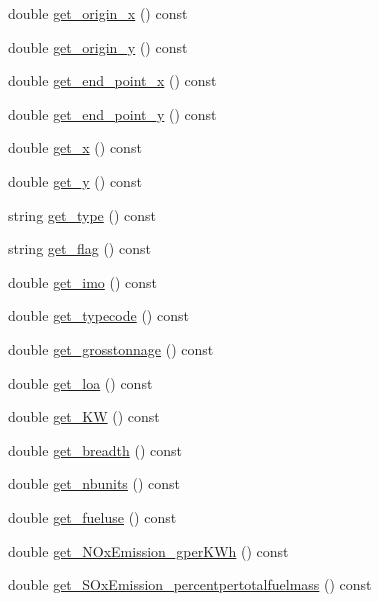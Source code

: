 \begin{DoxyCompactItemize}
\item 
double \mbox{\hyperlink{class_ship_a8a27995643103791ae161daff47b2e68}{get\+\_\+origin\+\_\+x}} () const
\item 
double \mbox{\hyperlink{class_ship_acefd31c97b2109ff2d02dcef6c4d52d0}{get\+\_\+origin\+\_\+y}} () const
\item 
double \mbox{\hyperlink{class_ship_a42817642d3c98dc0c73b1e59cf6f4ede}{get\+\_\+end\+\_\+point\+\_\+x}} () const
\item 
double \mbox{\hyperlink{class_ship_ab18f349fe24009bae6acbeb93f3374f1}{get\+\_\+end\+\_\+point\+\_\+y}} () const
\item 
double \mbox{\hyperlink{class_ship_a3ae4ab1dee931dfe6e3b8ccedea54f8a}{get\+\_\+x}} () const
\item 
double \mbox{\hyperlink{class_ship_a7a60d5c792ede19acd19f487a1336568}{get\+\_\+y}} () const
\item 
string \mbox{\hyperlink{class_ship_aebaeb01a662f1f7e931b98cdea0c53e9}{get\+\_\+type}} () const
\item 
string \mbox{\hyperlink{class_ship_a901e3a79889183f5b52b0c5efaf191c9}{get\+\_\+flag}} () const
\item 
double \mbox{\hyperlink{class_ship_a3b33ce198d3e5db2e5a06a8606d99df9}{get\+\_\+imo}} () const
\item 
double \mbox{\hyperlink{class_ship_aef1503d801ea6d480de882893ca1f492}{get\+\_\+typecode}} () const
\item 
double \mbox{\hyperlink{class_ship_aa3f9fa5e1ac6eba7b4608ba437c110ff}{get\+\_\+grosstonnage}} () const
\item 
double \mbox{\hyperlink{class_ship_aba267883849eb02822480b2564919cdc}{get\+\_\+loa}} () const
\item 
double \mbox{\hyperlink{class_ship_af2069867a366ae1c419abc83c8997525}{get\+\_\+\+KW}} () const
\item 
double \mbox{\hyperlink{class_ship_a7fcbd35c60b95c56e7f963709cbefc26}{get\+\_\+breadth}} () const
\item 
double \mbox{\hyperlink{class_ship_a6b424d1428e06721e0496fff8b5583fc}{get\+\_\+nbunits}} () const
\item 
double \mbox{\hyperlink{class_ship_ada93b23a03f80baa2e148cc24d628a7d}{get\+\_\+fueluse}} () const
\item 
double \mbox{\hyperlink{class_ship_a96eb0a840c25f7ccd567437990acf2a3}{get\+\_\+\+N\+Ox\+Emission\+\_\+gper\+K\+Wh}} () const
\item 
double \mbox{\hyperlink{class_ship_a998e0000dd910bc994fd12f4aaf563b0}{get\+\_\+\+S\+Ox\+Emission\+\_\+percentpertotalfuelmass}} () const

\end{DoxyCompactItemize}
